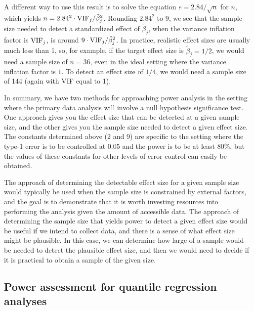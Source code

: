 A different way to use this result is to solve the equation $e = 2.84 / \sqrt{n}$ for $n$, which yields $n = 2.84^2\cdot{\rm VIF}_j / \tilde{\beta}_j^2$.  Rounding $2.84^2$ to $9$, we see that the sample size needed to detect a standardized effect of $\tilde{\beta}_j$, when the variance inflation factor is ${\rm VIF}_j$, is around $9\cdot{\rm VIF}_j / \tilde{\beta}_j^2$.  In practice, realistic effect sizes are usually much less than 1, so, for example, if the target effect size is $\tilde{\beta}_j = 1/2$, we would need a sample size of $n=36$, even in the ideal setting where the variance inflation factor is $1$.  To detect an effect size of $1/4$, we would need a sample size of 144 (again with VIF equal to 1).

In summary, we have two methods for approaching power analysis in the setting where the primary data analysis will involve a null hypothesis significance test.  One approach gives you the effect size that can be detected at a given sample size, and the other gives you the sample size needed to detect a given effect size.  The constants determined above (2 and 9) are specific to the setting where the type-1 error is to be controlled at 0.05 and the power is to be at least 80\%, but the values of these constants for other levels of error control can easily be obtained.

The approach of determining the detectable effect size for a given sample size would typically be used when the sample size is constrained by external factors, and the goal is to demonstrate that it is worth investing resources into performing the analysis given the amount of accessible data.  The approach of determining the sample size that yields power to detect a given effect size would be useful if we intend to collect data, and there is a sense of what effect size might be plausible.  In this case, we can determine how large of a sample would be needed to detect the plausible effect size, and then we would need to decide if it is practical to obtain a sample of the given size.

\subsection{Power assessment for quantile regression analyses}

